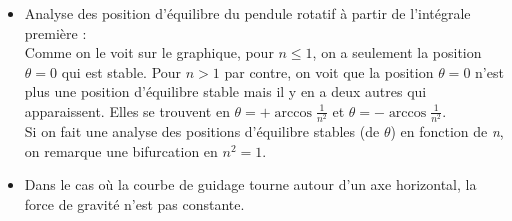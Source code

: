 \documentclass[a4paper]{article}
\begin{document}
\begin{itemize}
\item Analyse des position d'équilibre du pendule rotatif à partir de l'intégrale première : \\
Comme on le voit sur le graphique, pour $ n \leq 1 $, on a seulement la position $ \theta = 0 $ qui est stable. Pour $ n > 1 $ par contre, on voit que la position $ \theta = 0 $ n'est plus une position d'équilibre stable mais il y en a deux autres qui apparaissent. Elles se trouvent en $ \theta = + \arccos \frac{1}{n^2} $ et $ \theta = - \arccos \frac{1}{n^2} $. \\
Si on fait une analyse des positions d'équilibre stables (de $ \theta $) en fonction de \emph{n}, on remarque une bifurcation en $ n^2 = 1 $.

\begin{center}  \end{center}





\item Dans le cas où la courbe de guidage tourne autour d'un axe horizontal, la force de gravité n'est pas constante.



\end{itemize}
\end{document}
